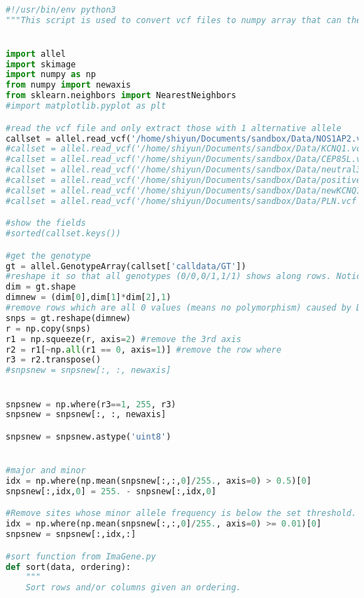 \begin{lstlisting}[language=Python,breaklines]

#!/usr/bin/env python3
"""This script is used to convert vcf files to numpy array that can then be predicted by the trained model"""


import allel
import skimage
import numpy as np
from numpy import newaxis
from sklearn.neighbors import NearestNeighbors
#import matplotlib.pyplot as plt

#read the vcf file and only extract those with 1 alternative allele
callset = allel.read_vcf('/home/shiyun/Documents/sandbox/Data/NOS1AP2.vcf', numbers={'ALT': 1,'AF': 1})
#callset = allel.read_vcf('/home/shiyun/Documents/sandbox/Data/KCNQ1.vcf', numbers={'ALT': 1,'AF': 1})
#callset = allel.read_vcf('/home/shiyun/Documents/sandbox/Data/CEP85L.vcf', numbers={'ALT': 1,'AF': 1})
#callset = allel.read_vcf('/home/shiyun/Documents/sandbox/Data/neutral3.vcf', numbers={'ALT': 1,'AF': 1})
#callset = allel.read_vcf('/home/shiyun/Documents/sandbox/Data/positive.vcf', numbers={'ALT': 1,'AF': 1})
#callset = allel.read_vcf('/home/shiyun/Documents/sandbox/Data/newKCNQ1.vcf', numbers={'ALT': 1,'AF': 1})
#callset = allel.read_vcf('/home/shiyun/Documents/sandbox/Data/PLN.vcf', numbers={'ALT': 1,'AF': 1})

#show the fields
#sorted(callset.keys())

#get the genotype
gt = allel.GenotypeArray(callset['calldata/GT'])
#reshape it so that all genotypes (0/0,0/1,1/1) shows along rows. Notice that the row is haplotype while column is SNP sites.
dim = gt.shape
dimnew = (dim[0],dim[1]*dim[2],1)
#remove rows which are all 0 values (means no polymorphism) caused by DataSlicer
snps = gt.reshape(dimnew)
r = np.copy(snps)
r1 = np.squeeze(r, axis=2) #remove the 3rd axis
r2 = r1[~np.all(r1 == 0, axis=1)] #remove the row where
r3 = r2.transpose()
#snpsnew = snpsnew[:, :, newaxis]


snpsnew = np.where(r3==1, 255, r3)
snpsnew = snpsnew[:, :, newaxis]

snpsnew = snpsnew.astype('uint8')


#major and minor
idx = np.where(np.mean(snpsnew[:,:,0]/255., axis=0) > 0.5)[0]
snpsnew[:,idx,0] = 255. - snpsnew[:,idx,0]

#Remove sites whose minor allele frequency is below the set threshold.
idx = np.where(np.mean(snpsnew[:,:,0]/255., axis=0) >= 0.01)[0]
snpsnew = snpsnew[:,idx,:]

#sort function from ImaGene.py
def sort(data, ordering):
    """
    Sort rows and/or columns given an ordering.


\end{lstlisting}
